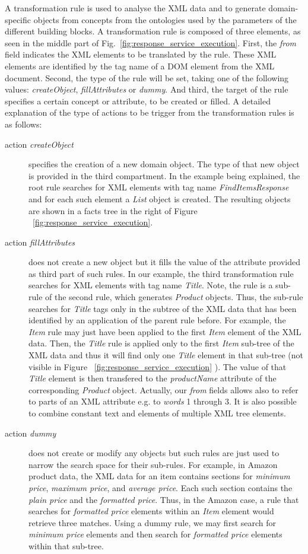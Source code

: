 A transformation rule is used to analyse the XML data and to generate domain-specific objects from concepts from the ontologies used by the parameters of the different building blocks. A transformation rule is composed of three elements, as seen in the middle part of Fig.~\ref{fig:response_service_execution}. First, the \textit{from} field indicates the XML elements to be translated by the rule. These XML elements are identified by the tag name of a DOM element from the XML document. Second, the type of the rule will be set, taking one of the following values: \emph{createObject}, \emph{fillAttributes} or \emph{dummy}. And third, the target of the rule specifies a certain concept or attribute, to be created or filled. A detailed explanation of the type of actions to be trigger from the transformation rules is as follows:
\begin{description}
	\item[action \emph{createObject}] specifies the creation of a new domain object. The type of that new object is provided in the third compartment. In the example being explained, the root rule searches for XML elements with tag name \emph{FindItemsResponse} and for each such element a \emph{List} object is created. The resulting objects are shown in a facts tree in the right of Figure ~\ref{fig:response_service_execution}.
	\item[action \emph{fillAttributes}] does not create a new object but it fills the value of the attribute provided as third part of such rules. In our example, the third transformation rule searches for XML elements with tag name \emph{Title}. Note, the rule is a sub-rule of the second rule, which generates \emph{Product} objects. Thus, the sub-rule searches for \emph{Title} tags only in the subtree of the XML data that has been identified by an application of the parent rule before. For example, the \emph{Item} rule may just have been applied to the first \emph{Item} element of the XML data. Then, the \emph{Title} rule is applied only to the first \emph{Item} sub-tree of the XML data and thus it will find only one \emph{Title} element in that sub-tree (not visible in Figure ~\ref{fig:response_service_execution} ). The value of that \emph{Title} element is then transfered to the \emph{productName} attribute of the corresponding \emph{Product} object. Actually, our \textit{from} fields allows also to refer to parts of an XML attribute e.g. to \textit{words} 1 through 3. It is also possible to combine constant text and elements of multiple XML tree elements. 
	\item[action \emph{dummy}] does not create or modify any objects but such rules are just used to narrow the search space for their sub-rules. For example, in Amazon product data, the XML data for an item contains sections for \emph{minimum price}, \emph{maximum price}, and \emph{average price}. Each such section contains the \emph{plain price} and the \emph{formatted price}. Thus, in the Amazon case, a rule that searches for \emph{formatted price} elements within an \emph{Item} element would retrieve three matches. Using a dummy rule, we may first search for \emph{minimum price} elements and then search for \emph{formatted price} elements within that sub-tree.
\end{description}

